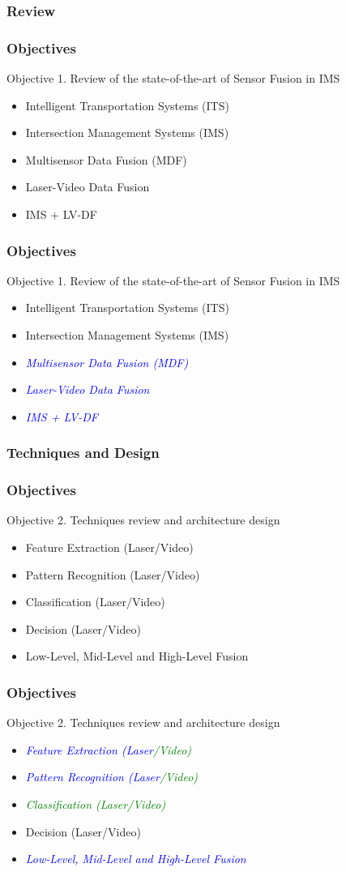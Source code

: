 \documentclass[table]{beamer}
\begin{document}
\subsubsection{Review}
\frame
{
	\frametitle{Objectives}
	Objective 1. Review of the state-of-the-art of Sensor Fusion in IMS
	\begin{itemize}
		\item Intelligent Transportation Systems (ITS)
		\item Intersection Management Systems (IMS)
		\item Multisensor Data Fusion (MDF)
		\item Laser-Video Data Fusion
		\item IMS + LV-DF
	\end{itemize}
}

\frame
{
	\frametitle{Objectives}
	Objective 1. Review of the state-of-the-art of Sensor Fusion in IMS
	\begin{itemize}
		\item Intelligent Transportation Systems (ITS)
		\item Intersection Management Systems (IMS)
		\item \textcolor{blue}{\emph{Multisensor Data Fusion (MDF)}}
		\item \textcolor{blue}{\emph{Laser-Video Data Fusion}}
		\item \textcolor{blue}{\emph{IMS + LV-DF}}
	\end{itemize}
}
\subsubsection{Techniques and Design}
\frame
{
	\frametitle{Objectives}
	Objective 2. Techniques review and architecture design
	\begin{itemize}
		\item Feature Extraction (Laser/Video)
		\item Pattern Recognition (Laser/Video)
		\item Classification (Laser/Video)
		\item Decision (Laser/Video)
		\item Low-Level, Mid-Level and High-Level Fusion
	\end{itemize}
}

\frame
{
	\frametitle{Objectives}
	Objective 2. Techniques review and architecture design
	\begin{itemize}		
		\item \textcolor{blue}{\emph{Feature Extraction (Laser}}\textcolor{green}{\emph{/Video)}}
		\item \textcolor{blue}{\emph{Pattern Recognition (Laser}}\textcolor{green}{\emph{/Video)}}
		\item \textcolor{green}{\emph{Classification (Laser/Video)}}
		\item Decision (Laser/Video)
		\item \textcolor{blue}{\emph{Low-Level, Mid-Level and High-Level Fusion}}
	\end{itemize}
}
\end{document}
